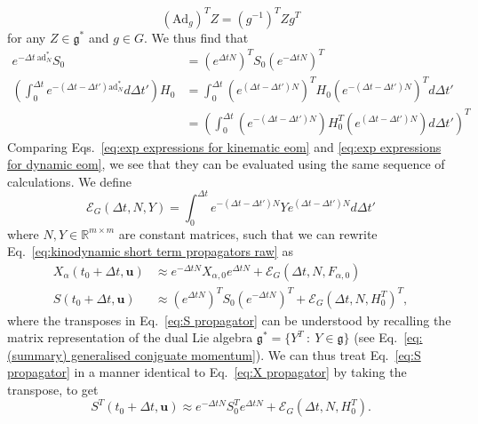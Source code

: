 \begin{equation} \label{eq:adjoint action transpose}
(\text{Ad}_g)^T Z = (g^{-1})^T Z g^T
\end{equation} 
for any $Z \in \mathfrak{g}^*$ and $g \in G$. We thus find that
\begin{subequations} \label{eq:exp expressions for dynamic eom}
	\begin{align}
		e^{-\Delta t\ \text{ad}^*_N} S_0 & = (e^{\Delta t N})^T S_0 (e^{- \Delta t N})^T \\
		\left( \int_0^{\Delta t} e^{-(\Delta t - \Delta t') \text{ad}^*_N} d \Delta t' \right) H_0 & = \int_0^{\Delta t} (e^{(\Delta t - \Delta t') N})^T H_0 (e^{-(\Delta t - \Delta t') N})^T d \Delta t' \nonumber \\
		& = \left( \int_0^{\Delta t} (e^{-(\Delta t - \Delta t') N}) H_0^T (e^{(\Delta t - \Delta t') N}) d \Delta t' \right)^T 
	\end{align}
\end{subequations}
Comparing Eqs.~\ref{eq:exp expressions for kinematic eom} and \ref{eq:exp expressions for dynamic eom}, we see that they can be evaluated using the same sequence of calculations. We define
\begin{equation}
	\mathscr{E}_G(\Delta t, N, Y) = \int_0^{\Delta t} e^{-(\Delta t - \Delta t') N} Y e^{(\Delta t - \Delta t') N} d \Delta t'
\end{equation}
where $N,Y \in \mathbb{R}^{m \times m}$ are constant matrices, such that we can rewrite Eq.~\ref{eq:kinodynamic short term propagators raw} as
\begin{subequations} \label{eq:kinodynamic short term propagators}
	\begin{align}
		X_{\alpha}(t_0 + \Delta t, \mathbf{u}) & \approx e^{- \Delta t N} X_{\alpha, 0} e^{ \Delta t N} + \mathscr{E}_G(\Delta t, N, F_{\alpha, 0}) \label{eq:X propagator} \\
		S(t_0 + \Delta t, \mathbf{u}) & \approx (e^{\Delta t N})^T S_0 (e^{-\Delta t N})^T + \mathscr{E}_G(\Delta t, N, H_0^T)^T, \label{eq:S propagator}
	\end{align}
\end{subequations}
where the transposes in Eq.~\ref{eq:S propagator} can be understood by recalling the matrix representation of the dual Lie algebra $\mathfrak{g}^* = \{ Y^T\ :\ Y \in \mathfrak{g} \}$ (see Eq.~\ref{eq:(summary) generalised conjguate momentum}). We can thus treat Eq.~\ref{eq:S propagator} in a manner identical to Eq.~\ref{eq:X propagator} by taking the transpose, to get
\begin{equation} 
	S^T(t_0 + \Delta t, \mathbf{u}) \approx e^{-\Delta t N} S^T_0 e^{\Delta t N} + \mathscr{E}_G(\Delta t, N, H_0^T).
\end{equation}
